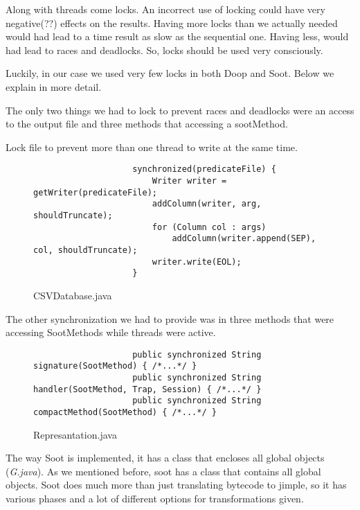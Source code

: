 \documentclass{dithesis}
\begin{document}
	Along with threads come locks. An incorrect use of locking could have very negative(??) effects on the results. Having more locks than we actually needed would had lead to a time result as slow as the sequential one. Having less, would had lead to races and deadlocks. So, locks should be used very consciously.

	Luckily, in our case we used very few locks in both Doop and Soot. Below we explain in more detail.
    
    	The only two things we had to lock to prevent races and deadlocks were an access to the output file and three methods that accessing a sootMethod.
    	
	    	Lock file to prevent more than one thread to write at the same time. 
	    	\begin{figure}[H]
	            \begin{lstlisting}
			    	synchronized(predicateFile) {
		                Writer writer = getWriter(predicateFile);
		                addColumn(writer, arg, shouldTruncate);
		                for (Column col : args)
		                    addColumn(writer.append(SEP), col, shouldTruncate);
		                writer.write(EOL);
	            	}
				\end{lstlisting}
	        \caption{CSVDatabase.java}
	        \end{figure}

	    	The other synchronization we had to provide was in three methods that were accessing SootMethods while threads were active.
	    	\begin{figure}[H]
	            \begin{lstlisting}
			    	public synchronized String signature(SootMethod) { /*...*/ }
			    	public synchronized String handler(SootMethod, Trap, Session) { /*...*/ }
			    	public synchronized String compactMethod(SootMethod) { /*...*/ }
				\end{lstlisting}
	        \caption{Represantation.java}
	        \end{figure}


	    The way Soot is implemented, it has a class that encloses all global objects (\textit{G.java}). As we mentioned before, soot has a class that contains all global objects. Soot does much more than just translating bytecode to jimple, so it has various phases and a lot of different options for transformations given. 
\end{document}
